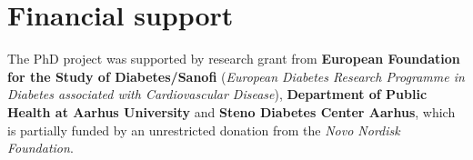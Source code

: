 \documentclass[
  a4paper,
  headsepline=true,
  open=any]{scrbook}
\begin{document}

\hypertarget{financial-support}{%
\section*{Financial support}\label{financial-support}}


The PhD project was supported by research grant from \textbf{European
Foundation for the Study of Diabetes/Sanofi} (\emph{European Diabetes
Research Programme in Diabetes associated with Cardiovascular Disease}),
\textbf{Department of Public Health at Aarhus University} and
\textbf{Steno Diabetes Center Aarhus}, which is partially funded by an
unrestricted donation from the \emph{Novo Nordisk Foundation}.
\end{document}

